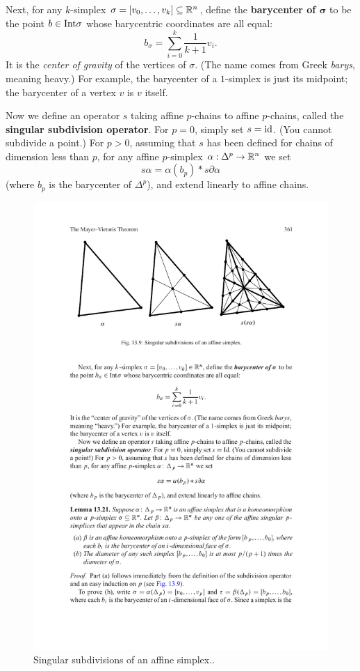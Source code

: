 Next, for any $k$-simplex $\sigma=[v_0,\dots,v_k]\subseteq\mathbb{R}^n$, define the \textbf{barycenter of $\bm{\sigma}$} to be the point $b\in\mathrm{Int}\sigma$ whose barycentric coordinates are all equal:
\[b_\sigma=\sum_{i=0}^{k}\dfrac{1}{k+1}v_i.\]
It is the \textit{center of gravity} of the vertices of $\sigma$. (The name comes from Greek \textit{barys}, meaning heavy.) For example, the barycenter of a $1$-simplex is just its midpoint; the barycenter of a vertex $v$ is $v$ itself.\par
Now we define an operator $s$ taking affine $p$-chains to affine $p$-chains, called the \textbf{singular subdivision operator}. For $p=0$, simply set $s=\mathrm{id}$. (You cannot subdivide a point.) For $p>0$, assuming that $s$ has been defined for chains of dimension less than $p$, for any affine $p$-simplex $\alpha:\Delta^p\to\mathbb{R}^n$ we set
\[s\alpha=\alpha(b_p)\ast s\partial\alpha\]
(where $b_p$ is the barycenter of $\Delta^p$), and extend linearly to affine chains.
\begin{figure}[htbp]
\centering
\includegraphics{pictures/barycenter-1}
\caption{Singular subdivisions of an affine simplex..}
\end{figure}
